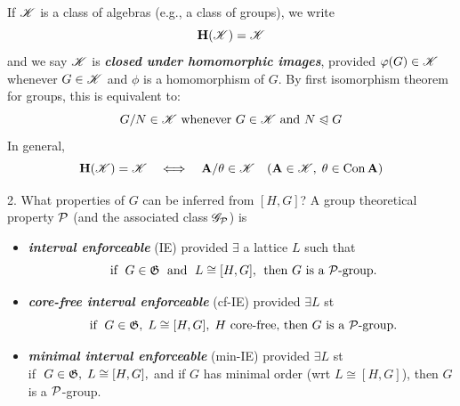 \documentclass[xcolor=dvipsnames,11pt,hide notes]{beamer}
\newcommand{\defn}[1]{\textcolor{olivegreen}{\textit{\textbf{#1}}}}
\newcommand{\IE}{{\small IE}}
\theoremstyle{definition}
\theoremstyle{remark}
\numberwithin{theorem}{section}
\numberwithin{claim}{section}
\numberwithin{equation}{section}
\numberwithin{conjecture}{section}
\begin{document}
\begin{frame}[fragile,label=HomImg]{}
If $\mathscr{K}$ is a class of algebras (e.g., a class of groups), 
we write 
\[\mathbf{H}(\mathscr{K}) = \mathscr{K}\]
and we say
$\mathscr{K}$ is \defn{closed under homomorphic images},
provided $\varphi(G)\in \mathscr{K}$ whenever $G\in \mathscr{K}$ and
$\phi$ is a homomorphism of $G$. 
\vskip4mm
By first isomorphism theorem for groups, this is equivalent to: 
\[
\text{$G/N\in \mathscr{K}$ whenever $G\in \mathscr{K}$ and $N\trianglelefteqslant G$}
\]
\vskip4mm
In general,
\[
\mathbf{H}(\mathscr{K}) = \mathscr{K}  \quad \Longleftrightarrow \quad \mathbf{A}/\theta \in \mathscr{K} \quad (\mathbf{A}\in \mathscr{K}, \; \theta \in \mathrm{Con\,}\mathbf{A})
\]
\end{frame}

\begin{frame}[label=IEProps]{2. What properties of $G$ can be inferred from $[H,G]$?}
A group theoretical property $\mathcal{P}$  (and the associated class $\mathscr{G}_{\mathcal{P}}$) is
\vskip2mm
\begin{itemize}
\item 
\defn{interval enforceable} (\IE) provided $\exists$ a lattice
$L$ such that
\[
\text{ if $\;G\in \mathfrak{G}\;$ and $\;L\cong [H,G],\;$  then $G$ is a $\mathcal{P}$-group.}
\]
\vskip2mm

\item
\defn{core-free interval enforceable} (cf-\IE) provided
$\exists L$ st
\[
\text{ if $\;G\in \mathfrak{G},\; L\cong [H,G],\;H$ core-free, then $G$ is a $\mathcal{P}$-group.}
\]
\vskip2mm

\item 
\defn{minimal interval enforceable} (min-\IE)
provided $\exists L$ st\\ 
if $\;G\in \mathfrak{G},\; L\cong [H,G],$ and if $G$ has minimal order (wrt
$L\cong [H,G]$), then $G$ is a $\mathcal{P}$-group.    
\end{itemize}

\end{frame}
\end{document}
